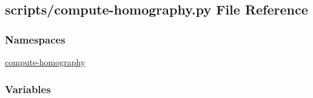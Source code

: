 \hypertarget{compute-homography_8py}{\subsection{scripts/compute-\/homography.py File Reference}
\label{compute-homography_8py}
}
\subsubsection*{Namespaces}
\begin{DoxyCompactItemize}
\item 
\hyperlink{namespacecompute-homography}{compute-\/homography}
\end{DoxyCompactItemize}
\subsubsection*{Variables}
